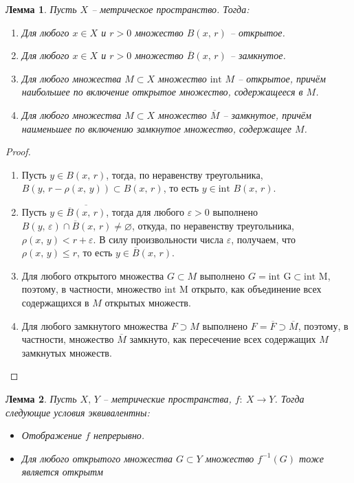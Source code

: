 \documentclass[a4paper,12pt]{article}
\renewcommand{\leq}{\ensuremath{\leqslant}}
\renewcommand{\emptyset}{\ensuremath{\varnothing}}
\theoremstyle{plain}
\newtheorem{lemma}{Лемма}[section]
\theoremstyle{definition}
\theoremstyle{remark}
\begin{document}
\begin{lemma}
  Пусть $X$ -- метрическое пространство. Тогда:
  \begin{enumerate}
    \item Для любого $x \in X$ и $r > 0$ множество $B(x,\,r)$ -- открытое.
    \item Для любого $x \in X$ и $r > 0$ множество $\overline{B}(x,\,r)$ -- замкнутое.
    \item Для любого множества $M \subset X$ множество $\text{int }M$ -- открытое, причём наибольшее по включение открытое множество, содержащееся в $M$.
    \item Для любого множества $M \subset X$ множество $\overline{M}$ -- замкнутое, причём наименьшее по включению замкнутое множество, содержащее $M$.
  \end{enumerate}
\end{lemma}

\begin{proof}
  \begin{enumerate}
    \item Пусть $y \in B(x,\,r)$, тогда, по неравенству треугольника, $B(y,\, r - \rho(x,\,y)) \subset B(x,\,r)$, то есть $y \in \text{int }B(x,\,r)$.
    \item Пусть $y \in \overline{\overline{B}(x,\,r)}$, тогда для любого $\varepsilon > 0$ выполнено $B(y,\,\varepsilon) \cap \overline{B}(x,\,r) \neq \emptyset$, откуда, по неравенству треугольника, $\rho(x,\,y) < r + \varepsilon$. В силу произвольности числа $\varepsilon$, получаем, что $\rho(x,\,y) \leq r$, то есть $y \in \overline{B}(x,\,r)$.
    \item Для любого открытого множества $G \subset M$ выполнено $G = \text{int G} \subset \text{int M}$, поэтому, в частности, множество $\text{int M}$ открыто, как объединение всех содержащихся в $M$ открытых множеств.
    \item Для любого замкнутого множества $F \supset M$ выполнено $F = \overline{F} \supset \overline{M}$, поэтому, в частности, множество $\overline{M}$ замкнуто, как пересечение всех содержащих $M$ замкнутых множеств.
  \end{enumerate}
\end{proof}

\begin{lemma}
  Пусть $X,\, Y$ -- метрические пространства, $f :\: X \to Y$. Тогда следующие условия эквивалентны:
  \begin{itemize}
    \item Отображение $f$ непрерывно.
    \item Для любого открытого множества $G \subset Y$ множество $f^{-1}(G)$ тоже является открытм
  \end{itemize}
\end{lemma}
\end{document}

